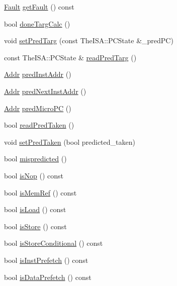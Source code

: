 \begin{DoxyCompactItemize}
\item 
\hyperlink{classRefCountingPtr}{Fault} \hyperlink{classBaseDynInst_a1ac977937b0a3cf64e58ba7141e4cc11}{getFault} () const 
\item 
bool \hyperlink{classBaseDynInst_a9a56f3bdfd0d5b331356265c62556516}{doneTargCalc} ()
\item 
void \hyperlink{classBaseDynInst_af3e113981ea1684fcf025086404d5f01}{setPredTarg} (const TheISA::PCState \&\_\-predPC)
\item 
const TheISA::PCState \& \hyperlink{classBaseDynInst_a88bba628e3f9c53e98e85412e59e44fe}{readPredTarg} ()
\item 
\hyperlink{base_2types_8hh_af1bb03d6a4ee096394a6749f0a169232}{Addr} \hyperlink{classBaseDynInst_aaf7104129d287861faf7fe235f4116e7}{predInstAddr} ()
\item 
\hyperlink{base_2types_8hh_af1bb03d6a4ee096394a6749f0a169232}{Addr} \hyperlink{classBaseDynInst_aabf159b9ae9ff5a404a04ef091d1f2d1}{predNextInstAddr} ()
\item 
\hyperlink{base_2types_8hh_af1bb03d6a4ee096394a6749f0a169232}{Addr} \hyperlink{classBaseDynInst_acc3cf1eeb9bc53f3e6660fbceea961ee}{predMicroPC} ()
\item 
bool \hyperlink{classBaseDynInst_acb2c4a00f6648221dac645d267f5e766}{readPredTaken} ()
\item 
void \hyperlink{classBaseDynInst_a62ee27d8bfd75838ea10c9dc8f97babc}{setPredTaken} (bool predicted\_\-taken)
\item 
bool \hyperlink{classBaseDynInst_a821a18b4aa4e70533b1df605037062cd}{mispredicted} ()
\item 
bool \hyperlink{classBaseDynInst_a45dbb9ace4c729e7bb701ce535fb1667}{isNop} () const 
\item 
bool \hyperlink{classBaseDynInst_a9b0f2cd082a656c4b5f369b5362c2f5b}{isMemRef} () const 
\item 
bool \hyperlink{classBaseDynInst_afef57d32aae2e0d962889f6e0537bf31}{isLoad} () const 
\item 
bool \hyperlink{classBaseDynInst_a75d02c30242181ed8a68f61087c2242d}{isStore} () const 
\item 
bool \hyperlink{classBaseDynInst_a7023ade89206ed967e6af7397cb744f8}{isStoreConditional} () const 
\item 
bool \hyperlink{classBaseDynInst_ab7deedfb63be4690f506acd0444dde3a}{isInstPrefetch} () const 
\item 
bool \hyperlink{classBaseDynInst_abe301c4b09b8eb65bc2203905b1abf53}{isDataPrefetch} () const 
\item 

\end{DoxyCompactItemize}
